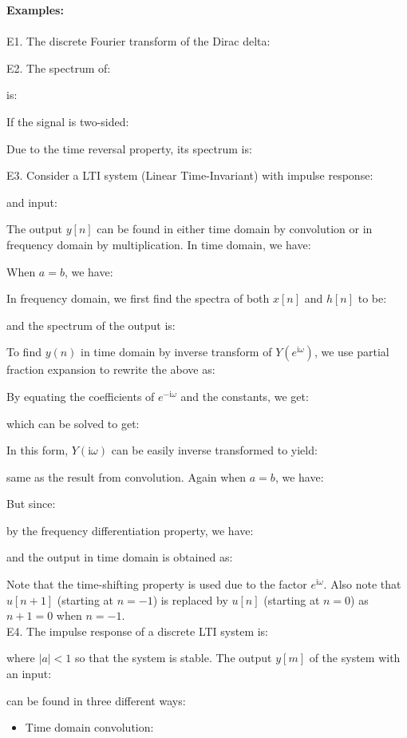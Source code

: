 	\begin{tcolorbox}[colframe=black,colback=white,sharp corners,breakable]
	\textbf{{\Large {}}Examples:}\\\\
	E1. The discrete Fourier transform of the Dirac delta:
	
	E2. The spectrum of:
	
	is:
	
	If the signal is two-sided:
	
	Due to the time reversal property, its spectrum is:
	
	E3. Consider a LTI system (Linear Time-Invariant) with impulse response:
	
	and input:
	
	The output $y[n]$ can be found in either time domain by convolution or in frequency domain by multiplication. In time domain, we have:
	
	When $a=b$, we have:
	
	In frequency domain, we first find the spectra of both $x[n]$ and $h[n]$ to be:
	
	and the spectrum of the output is:
	
	To find $y(n)$ in time domain by inverse transform of $Y(e^{\mathrm{i}\omega})$, we use partial fraction expansion to rewrite the above as:
	
	By equating the coefficients of $e^{-\mathrm{i}\omega}$ and the constants, we get:
	
	which can be solved to get:
	
	In this form, $Y(\mathrm{i}\omega)$ can be easily inverse transformed to yield:
	
	same as the result from convolution. Again when $a=b$, we have:
	
	But since:
	
	by the frequency differentiation property, we have:
	
	and the output in time domain is obtained as:
	
	Note that the time-shifting property is used due to the factor $e^{\mathrm{i}\omega}$. Also note that $u[n+1]$ (starting at $n=-1$) is replaced by $u[n]$ (starting at $n=0$) as $n+1=0$ when $n=-1$.\\
	
	E4. The impulse response of a discrete LTI system is:
	
	where $|a|<1$ so that the system is stable. The output $y[m]$ of the system with an input:
	
	can be found in three different ways:
	\begin{itemize}
		\item Time domain convolution: 
		

\end{itemize}
\end{tcolorbox}
